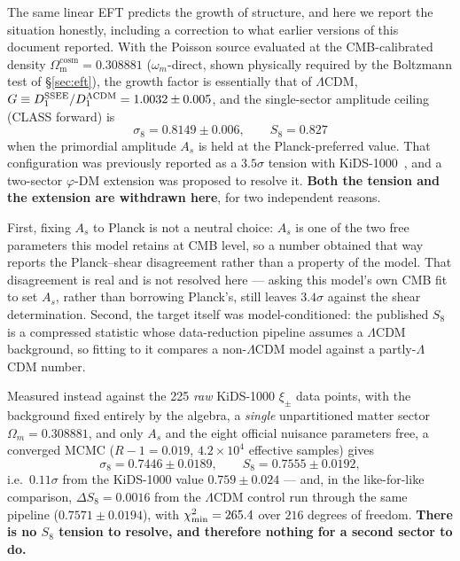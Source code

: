 \documentclass[a4paper,11pt]{article}
\newcommand{\Om}{\Omega_{\mathrm{m}}}
\begin{document}
The same linear EFT predicts the growth of structure, and here we report the
situation honestly, including a correction to what earlier versions of this
document reported. With the Poisson source evaluated at the CMB-calibrated
density $\Om^{\mathrm{cosm}}=0.308881$ ($\omega_m$-direct, shown physically
required by the Boltzmann test of \S\ref{sec:eft}), the growth factor is
essentially that of $\Lambda$CDM,
$G\equiv D_1^{\rm SSEE}/D_1^{\Lambda\rm CDM}=1.0032\pm0.005$, and the
single-sector amplitude ceiling (CLASS forward) is
\begin{equation}
  \label{eq:s8}
  \sigma_8=0.8149\pm0.006 , \qquad S_8=0.827
\end{equation}
when the primordial amplitude $A_s$ is held at the Planck-preferred value.
That configuration was previously reported as a $3.5\sigma$ tension with
KiDS-1000~\citep{KiDS2021,DESY32022}, and a two-sector $\varphi$-DM extension
was proposed to resolve it. \textbf{Both the tension and the extension are
withdrawn here}, for two independent reasons.

First, fixing $A_s$ to Planck is not a neutral choice: $A_s$ is one of the two
free parameters this model retains at CMB level, so a number obtained that way
reports the Planck--shear disagreement rather than a property of the model.
That disagreement is real and is not resolved here --- asking this model's own
CMB fit to set $A_s$, rather than borrowing Planck's, still leaves
$3.4\sigma$ against the shear determination. Second, the target itself was model-conditioned: the published $S_8$
is a compressed statistic whose data-reduction pipeline assumes a $\Lambda$CDM
background, so fitting to it compares a non-$\Lambda$CDM model against a
partly-$\Lambda$CDM number.

Measured instead against the 225 \emph{raw} KiDS-1000 $\xi_\pm$ data points,
with the background fixed entirely by the algebra, a \emph{single}
unpartitioned matter sector $\Omega_m=0.308881$, and only $A_s$ and the eight
official nuisance parameters free, a converged MCMC ($R-1=0.019$,
$4.2\times10^4$ effective samples) gives
\begin{equation}
  \sigma_8 = 0.7446\pm0.0189, \qquad S_8 = 0.7555\pm0.0192,
\end{equation}
i.e.\ $0.11\sigma$ from the KiDS-1000 value $0.759\pm0.024$ --- and, in the like-for-like comparison, $\Delta S_8=0.0016$ from the $\Lambda$CDM control run through the same pipeline ($0.7571\pm0.0194$), with
$\chi^2_{\rm min}=265.4$ over $216$ degrees of freedom. \textbf{There is no
$S_8$ tension to resolve, and therefore nothing for a second sector to do.}
\end{document}
